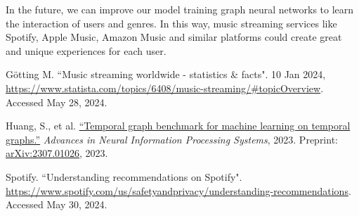 \documentclass[10pt, letterpaper]{article}
\renewcommand{\section}[1]{%
	    \vspace{\parskip}
		{\large \bfseries\uppercase{#1}}
}
\begin{document}
In the future, we can improve our model training graph neural networks to learn the interaction of users and genres. In this way, music streaming services like Spotify, Apple Music, Amazon Music and similar platforms could create great and unique experiences for each user. 




\begingroup

\renewcommand{\section}[2]{}%

\begin{thebibliography}{3}

Götting M. 
``Music streaming worldwide - statistics \& facts". 10 Jan 2024, \url{https://www.statista.com/topics/6408/music-streaming/#topicOverview}. Accessed May 28, 2024. 
	
Huang, S., et al.
\href{https://doi.org/10.48550/arXiv.2307.01026}
{``Temporal graph benchmark for machine learning on temporal graphs.''} {\em Advances in Neural Information Processing Systems}, 2023. Preprint: \url{arXiv:2307.01026}, 2023.

Spotify. ``Understanding recommendations on Spotify".  \url{https://www.spotify.com/us/safetyandprivacy/understanding-recommendations}.  Accessed May 30, 2024. 
	
\end{thebibliography}

\endgroup	
	
\end{document}
